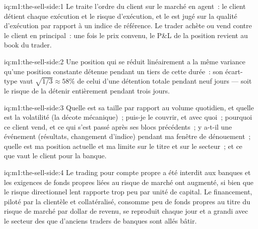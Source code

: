 \begin{solution}{iq:m1:the-sell-side:1}
Le  traite l'ordre du client sur le marché en agent~: le client
détient chaque exécution et le risque d'exécution, et le  est
jugé sur la qualité d'exécution par rapport à un indice de référence. Le trader achète ou vend
contre le client en principal~: une fois le prix convenu, le P\&L de la
position revient au book du trader.
\end{solution}

\begin{solution}{iq:m1:the-sell-side:2}
Une position qui se réduit linéairement a la même variance qu'une position constante détenue pendant
un tiers de cette durée~: son écart-type vaut $\sqrt{1/3} \approx 58\%$ de celui
d'une détention totale pendant neuf jours --- soit le risque de la détenir entièrement pendant trois jours.
\end{solution}

\begin{solution}{iq:m1:the-sell-side:3}
Quelle est sa taille par rapport au volume quotidien, et quelle est la volatilité (la
décote mécanique)~; puis-je le couvrir, et avec quoi~; pourquoi ce client
vend, et ce qui s'est passé après ses blocs précédents~; y a-t-il une
événement (résultats, changement d'indice) pendant ma fenêtre de dénouement~; quelle est ma position
actuelle et ma limite sur le titre et sur le secteur~; et ce que vaut le client
pour la banque.
\end{solution}

\begin{solution}{iq:m1:the-sell-side:4}
Le trading pour compte propre a été interdit aux banques et les exigences de
fonds propres liées au risque de marché ont augmenté, si bien que le risque directionnel lent rapporte trop peu par unité de
capital. Le financement, piloté par la clientèle et collatéralisé, consomme peu
de fonds propres au titre du risque de marché par dollar de revenu, se reproduit chaque jour et a grandi avec
le secteur des  que d'anciens traders de banques sont allés bâtir.
\end{solution}

